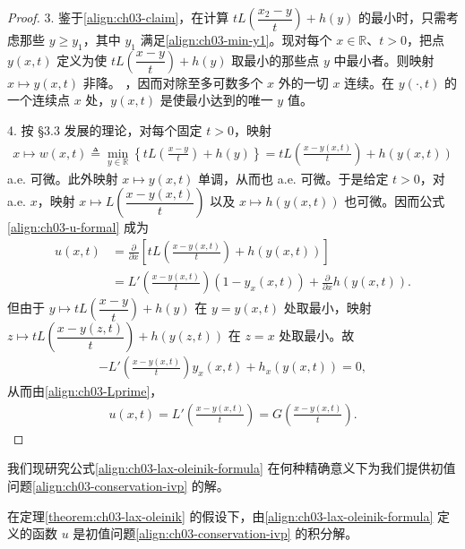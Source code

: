 \documentclass[../../main.tex]{subfiles}
\begin{document}
\begin{proof}
3. 鉴于\eqref{align:ch03-claim}，在计算 $tL\!\left(\dfrac{x_2-y}{t}\right)+h(y)$ 的最小时，只需考虑那些 $y\geqslant y_1$，其中 $y_1$ 满足\eqref{align:ch03-min-y1}。现对每个 $x\in\mathbb{R}$、$t>0$，把点 $y(x,t)$ 定义为使 $tL\!\left(\dfrac{x-y}{t}\right)+h(y)$ 取最小的那些点 $y$ 中最小者。则映射 $x\mapsto y(x,t)$ 非降。
，因而对除至多可数多个 $x$ 外的一切 $x$ 连续。在 $y(\cdot,t)$ 的一个连续点 $x$ 处，$y(x,t)$ 是使最小达到的唯一 $y$ 值。

4. 按 \S3.3 发展的理论，对每个固定 $t>0$，映射
\begin{align*}
x\mapsto w(x,t)\triangleq\min_{y\in\mathbb{R}}\left\{tL\!\left(\frac{x-y}{t}\right)+h(y)\right\}=tL\!\left(\frac{x-y(x,t)}{t}\right)+h(y(x,t))
\end{align*}
a.e. 可微。此外映射 $x\mapsto y(x,t)$ 单调，从而也 a.e. 可微。于是给定 $t>0$，对 a.e. $x$，映射 $x\mapsto L\!\left(\dfrac{x-y(x,t)}{t}\right)$ 以及 $x\mapsto h(y(x,t))$ 也可微。因而公式\eqref{align:ch03-u-formal} 成为
\begin{align*}
u(x,t)&=\frac{\partial}{\partial x}\left[tL\!\left(\frac{x-y(x,t)}{t}\right)+h(y(x,t))\right]\\
&=L'\!\left(\frac{x-y(x,t)}{t}\right)(1-y_x(x,t))+\frac{\partial}{\partial x}h(y(x,t)).
\end{align*}
但由于 $y\mapsto tL\!\left(\dfrac{x-y}{t}\right)+h(y)$ 在 $y=y(x,t)$ 处取最小，映射 $z\mapsto tL\!\left(\dfrac{x-y(z,t)}{t}\right)+h(y(z,t))$ 在 $z=x$ 处取最小。故
\begin{align*}
-L'\!\left(\frac{x-y(x,t)}{t}\right)y_x(x,t)+h_x(y(x,t))=0,
\end{align*}
从而由\eqref{align:ch03-Lprime}，
\begin{align*}
u(x,t)=L'\!\left(\frac{x-y(x,t)}{t}\right)=G\!\left(\frac{x-y(x,t)}{t}\right).
\end{align*}
\end{proof}

我们现研究公式\eqref{align:ch03-lax-oleinik-formula} 在何种精确意义下为我们提供初值问题\eqref{align:ch03-conservation-ivp} 的解。

\begin{theorem}\label{theorem:ch03-lax-oleinik-integral}在定理\cref{theorem:ch03-lax-oleinik} 的假设下，由\eqref{align:ch03-lax-oleinik-formula} 定义的函数 $u$ 是初值问题\eqref{align:ch03-conservation-ivp} 的积分解。
\end{theorem}
\end{document}
